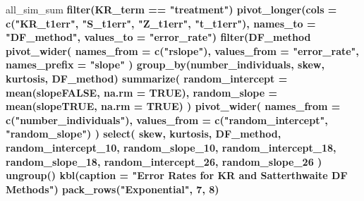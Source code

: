 \documentclass[12pt, twoside]{amherstthesis}
\newenvironment{Shaded}{\begin{snugshade}}{\end{snugshade}}
\newcommand{\DataTypeTok}[1]{\textcolor[rgb]{0.13,0.29,0.53}{#1}}
\newcommand{\DecValTok}[1]{\textcolor[rgb]{0.00,0.00,0.81}{#1}}
\newcommand{\KeywordTok}[1]{\textcolor[rgb]{0.13,0.29,0.53}{\textbf{#1}}}
\newcommand{\NormalTok}[1]{#1}
\newcommand{\OperatorTok}[1]{\textcolor[rgb]{0.81,0.36,0.00}{\textbf{#1}}}
\newcommand{\OtherTok}[1]{\textcolor[rgb]{0.56,0.35,0.01}{#1}}
\newcommand{\StringTok}[1]{\textcolor[rgb]{0.31,0.60,0.02}{#1}}
\begin{document}
\begin{Shaded}
\begin{Highlighting}[]
{{{\NormalTok{all_sim_sum }\OperatorTok{%>%}
\StringTok{  }\KeywordTok{filter}\NormalTok{(KR_term }\OperatorTok{==}\StringTok{ "treatment"}\NormalTok{) }\OperatorTok{%>%}
\StringTok{  }\KeywordTok{pivot_longer}\NormalTok{(}\DataTypeTok{cols =} \KeywordTok{c}\NormalTok{(}\StringTok{"KR_t1err"}\NormalTok{, }\StringTok{"S_t1err"}\NormalTok{, }\StringTok{"Z_t1err"}\NormalTok{, }\StringTok{"t_t1err"}\NormalTok{), }
               \DataTypeTok{names_to =} \StringTok{"DF_method"}\NormalTok{, }\DataTypeTok{values_to =} \StringTok{"error_rate"}\NormalTok{) }\OperatorTok{%>%}
\StringTok{  }\KeywordTok{filter}\NormalTok{(DF_method }\OperatorTok{%in%}\StringTok{ }\KeywordTok{c}\NormalTok{(}\StringTok{"KR_t1err"}\NormalTok{, }\StringTok{"S_t1err"}\NormalTok{)) }\OperatorTok{%>%}
\StringTok{  }\KeywordTok{pivot_wider}\NormalTok{(}
    \DataTypeTok{names_from =} \KeywordTok{c}\NormalTok{(}\StringTok{"rslope"}\NormalTok{),}
    \DataTypeTok{values_from =} \StringTok{"error_rate"}\NormalTok{, }\DataTypeTok{names_prefix =} \StringTok{"slope"}
\NormalTok{  ) }\OperatorTok{%>%}
\StringTok{  }\KeywordTok{group_by}\NormalTok{(number_individuals, skew, kurtosis, DF_method) }\OperatorTok{%>%}
\StringTok{  }\KeywordTok{summarize}\NormalTok{(}
    \DataTypeTok{random_intercept =} \KeywordTok{mean}\NormalTok{(slopeFALSE, }\DataTypeTok{na.rm =} \OtherTok{TRUE}\NormalTok{),}
    \DataTypeTok{random_slope =} \KeywordTok{mean}\NormalTok{(slopeTRUE, }\DataTypeTok{na.rm =} \OtherTok{TRUE}\NormalTok{)}
\NormalTok{  ) }\OperatorTok{%>%}
\StringTok{  }\KeywordTok{pivot_wider}\NormalTok{(}
    \DataTypeTok{names_from =} \KeywordTok{c}\NormalTok{(}\StringTok{"number_individuals"}\NormalTok{),}
    \DataTypeTok{values_from =} \KeywordTok{c}\NormalTok{(}\StringTok{"random_intercept"}\NormalTok{, }\StringTok{"random_slope"}\NormalTok{)}
\NormalTok{  ) }\OperatorTok{%>%}
\StringTok{  }\KeywordTok{select}\NormalTok{(}
\NormalTok{    skew, kurtosis, DF_method, random_intercept_}\DecValTok{10}\NormalTok{, random_slope_}\DecValTok{10}\NormalTok{, }
\NormalTok{    random_intercept_}\DecValTok{18}\NormalTok{,}
\NormalTok{    random_slope_}\DecValTok{18}\NormalTok{, random_intercept_}\DecValTok{26}\NormalTok{, random_slope_}\DecValTok{26}
\NormalTok{  ) }\OperatorTok{%>%}
\StringTok{  }\KeywordTok{ungroup}\NormalTok{() }\OperatorTok{%>%}
\StringTok{  }\KeywordTok{kbl}\NormalTok{(}\DataTypeTok{caption =} \StringTok{"Error Rates for KR and Satterthwaite DF Methods"}\NormalTok{) }\OperatorTok{%>%}
\StringTok{  }\KeywordTok{pack_rows}\NormalTok{(}\StringTok{"Exponential"}\NormalTok{, }\DecValTok{7}\NormalTok{, }\DecValTok{8}\NormalTok{) }\OperatorTok{%>%}
}}}}}}}}}}}}}}}
\end{Highlighting}
\end{Shaded}
\end{document}
